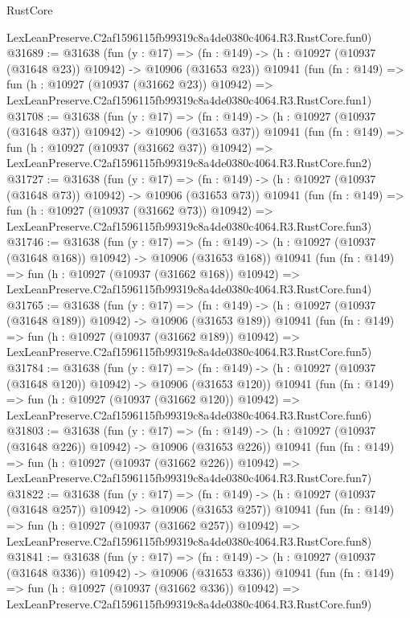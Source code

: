 \begin{lexlean}{RustCore}
\begin{coremodule}
    LexLeanPreserve.C2af1596115fb99319c8a4de0380c4064.R3.RustCore.fun0)
@31689 := @31638
    (fun (y : @17) =>
    (fn : @149) -> (h : @10927 (@10937 (@31648 @23)) @10942) -> @10906 (@31653 @23))
    @10941
    (fun (fn : @149) =>
    fun (h : @10927 (@10937 (@31662 @23)) @10942) =>
    LexLeanPreserve.C2af1596115fb99319c8a4de0380c4064.R3.RustCore.fun1)
@31708 := @31638
    (fun (y : @17) =>
    (fn : @149) -> (h : @10927 (@10937 (@31648 @37)) @10942) -> @10906 (@31653 @37))
    @10941
    (fun (fn : @149) =>
    fun (h : @10927 (@10937 (@31662 @37)) @10942) =>
    LexLeanPreserve.C2af1596115fb99319c8a4de0380c4064.R3.RustCore.fun2)
@31727 := @31638
    (fun (y : @17) =>
    (fn : @149) -> (h : @10927 (@10937 (@31648 @73)) @10942) -> @10906 (@31653 @73))
    @10941
    (fun (fn : @149) =>
    fun (h : @10927 (@10937 (@31662 @73)) @10942) =>
    LexLeanPreserve.C2af1596115fb99319c8a4de0380c4064.R3.RustCore.fun3)
@31746 := @31638
    (fun (y : @17) =>
    (fn : @149) -> (h : @10927 (@10937 (@31648 @168)) @10942) -> @10906 (@31653 @168))
    @10941
    (fun (fn : @149) =>
    fun (h : @10927 (@10937 (@31662 @168)) @10942) =>
    LexLeanPreserve.C2af1596115fb99319c8a4de0380c4064.R3.RustCore.fun4)
@31765 := @31638
    (fun (y : @17) =>
    (fn : @149) -> (h : @10927 (@10937 (@31648 @189)) @10942) -> @10906 (@31653 @189))
    @10941
    (fun (fn : @149) =>
    fun (h : @10927 (@10937 (@31662 @189)) @10942) =>
    LexLeanPreserve.C2af1596115fb99319c8a4de0380c4064.R3.RustCore.fun5)
@31784 := @31638
    (fun (y : @17) =>
    (fn : @149) -> (h : @10927 (@10937 (@31648 @120)) @10942) -> @10906 (@31653 @120))
    @10941
    (fun (fn : @149) =>
    fun (h : @10927 (@10937 (@31662 @120)) @10942) =>
    LexLeanPreserve.C2af1596115fb99319c8a4de0380c4064.R3.RustCore.fun6)
@31803 := @31638
    (fun (y : @17) =>
    (fn : @149) -> (h : @10927 (@10937 (@31648 @226)) @10942) -> @10906 (@31653 @226))
    @10941
    (fun (fn : @149) =>
    fun (h : @10927 (@10937 (@31662 @226)) @10942) =>
    LexLeanPreserve.C2af1596115fb99319c8a4de0380c4064.R3.RustCore.fun7)
@31822 := @31638
    (fun (y : @17) =>
    (fn : @149) -> (h : @10927 (@10937 (@31648 @257)) @10942) -> @10906 (@31653 @257))
    @10941
    (fun (fn : @149) =>
    fun (h : @10927 (@10937 (@31662 @257)) @10942) =>
    LexLeanPreserve.C2af1596115fb99319c8a4de0380c4064.R3.RustCore.fun8)
@31841 := @31638
    (fun (y : @17) =>
    (fn : @149) -> (h : @10927 (@10937 (@31648 @336)) @10942) -> @10906 (@31653 @336))
    @10941
    (fun (fn : @149) =>
    fun (h : @10927 (@10937 (@31662 @336)) @10942) =>
    LexLeanPreserve.C2af1596115fb99319c8a4de0380c4064.R3.RustCore.fun9)

\end{coremodule}
\end{lexlean}
